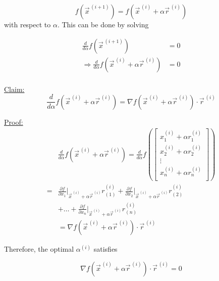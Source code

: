 \begin{equation*}
    f\left(\vec{x}^{\,(i+1)}\right) = f\left(\vec{x}^{\,(i)} + \alpha\vec{r}^{\,(i)}\right)
\end{equation*}
with respect to $\alpha$. This can be done by solving

\begin{align*}
    \frac{d}{d\alpha}f\left(\vec{x}^{\,(i+1)}\right) &= 0\\
    \Rightarrow \frac{d}{d\alpha}f\left(\vec{x}^{\,(i)} + \alpha\vec{r}^{\,(i)}\right) &= 0\\
\end{align*}

\underline{Claim:}
\begin{equation*}
         \frac{d}{d\alpha}f\left(\vec{x}^{\,(i)} + \alpha\vec{r}^{\,(i)}\right) = \nabla f\left(\vec{x}^{\,(i)} + \alpha\vec{r}^{\,(i)}\right)\cdot \vec{r}^{\,(i)}
\end{equation*}

\underline{Proof:}
\begin{align*}
    &\frac{d}{d\alpha}f\left(\vec{x}^{\,(i)} + \alpha\vec{r}^{\,(i)}\right) =
    \frac{d}{d\alpha}f\left(
    \begin{bmatrix}
        x^{(i)}_1 + \alpha r^{(i)}_1 \\
        x^{(i)}_2 + \alpha r^{(i)}_2 \\
        \vdots \\
        x^{(i)}_n + \alpha r^{(i)}_n \\
    \end{bmatrix}
    \right)\\
    = &\frac{\partial f}{\partial x_1}\bigg\rvert_{\vec{x}^{\,(i)} + \alpha\vec{r}^{\,(i)}} r_{(1)}^{(i)}
    + \frac{\partial f}{\partial x_2}\bigg\rvert_{\vec{x}^{\,(i)} + \alpha\vec{r}^{\,(i)}} r_{(2)}^{(i)}\\
    & + \ldots + \frac{\partial f}{\partial x_n}\bigg\rvert_{\vec{x}^{\,(i)} + \alpha\vec{r}^{\,(i)}} r_{(n)}^{(i)}\\
    &= \nabla f\left(\vec{x}^{\,(i)} + \alpha\vec{r}^{\,(i)}\right)\cdot \vec{r}^{\,(i)}
\end{align*}


Therefore, the optimal $\alpha^{(i)}$ satisfies

\begin{equation*}
    \nabla f\left(\vec{x}^{\,(i)} + \alpha \vec{r}^{\,(i)}\right)\cdot \vec{r}^{\,(i)} = 0
\end{equation*}

